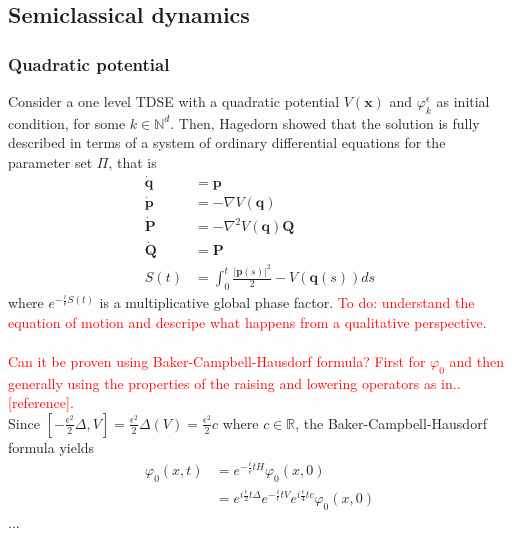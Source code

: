 \usepackage{amsmath}


\subsection{Semiclassical dynamics}
\subsubsection{Quadratic potential}
Consider a one level TDSE with a quadratic potential 
$V(\bm{x})$ and $\varphi_k^{\epsilon}$ as initial condition, 
for some $k \in \mathbb{N}^d$. 
Then, Hagedorn showed that the solution is fully described in 
terms of a system of ordinary differential equations for the parameter set $\Pi$,
that is
\begin{align}
  \dot{\bm{q}} &= \bm{p}
    \label{hagedorn:hagedorn_dynamics:parameters:evolution:q}
    \\
  \dot{\bm{p}} &=-\nabla V(\bm{q})
    \label{hagedorn:hagedorn_dynamics:parameters:evolution:p}
    \\
  \dot{\bm{P}} &=-\nabla^2 V(\bm{q})\bm{Q}
    \label{hagedorn:hagedorn_dynamics:parameters:evolution:P}
    \\
    \dot{\bm{Q}} &= \bm{P}
    \label{hagedorn:hagedorn_dynamics:parameters:evolution:Q}
    \\
    S(t) &= \int_0^t \frac{|\bm{p}(s)|^2}{2} - V(\bm{q}(s))  ds
    \label{hagedorn:hagedorn_dynamics:parameters:evolution:S}
\end{align}
where $e^{-\frac{i}{\epsilon}S(t)}$ is a multiplicative global phase 
factor.
\textcolor{red}{To do: understand the equation of motion and descripe what 
happens from a qualitative perspective.}
\\\\
\textcolor{red}{Can it be proven using Baker-Campbell-Hausdorf formula? First for 
$\varphi_0$ and then generally using the properties of the raising and lowering 
operators as in..[reference].}
\\
Since 
   $ \left[
      -\frac{\epsilon^2}{2} \Delta, V
    \right]
    =
    \frac{\epsilon^2}{2} \Delta (V)
    = 
    \frac{\epsilon^2}{2} c 
  $
  where $c \in \mathbb{R}$, the Baker-Campbell-Hausdorf formula yields 
  \begin{equation}
    \begin{split}
      \varphi_{0}(x,t) &= e^{-\frac{i}{\epsilon}t H } \varphi_{0}(x,0) 
      \\
      &=
      e^{i\frac{\epsilon}{2}t \Delta} e^{-\frac{i}{\epsilon}tV} e^{i\frac{\epsilon}{4}t c} \varphi_{0}(x,0)
    \end{split}
  \end{equation}
  ...
%
%
%
%
%
